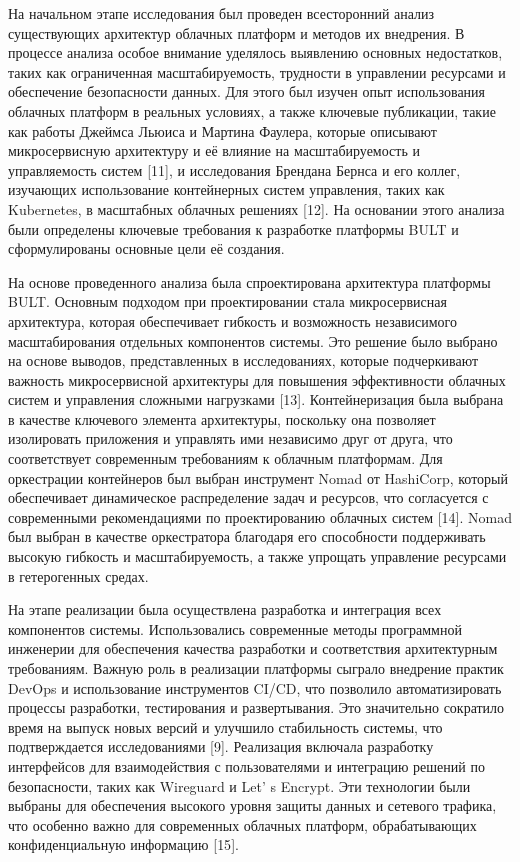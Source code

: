 {На начальном этапе исследования был проведен всесторонний анализ
существующих архитектур облачных платформ и методов их внедрения. В
процессе анализа особое внимание уделялось выявлению основных
недостатков, таких как ограниченная масштабируемость, трудности в
управлении ресурсами и обеспечение безопасности данных. Для этого был
изучен опыт использования облачных платформ в реальных условиях, а также
ключевые публикации, такие как работы Джеймса Льюиса и Мартина Фаулера,
которые описывают микросервисную архитектуру и её влияние на
масштабируемость и управляемость систем {[}11{]}, и исследования
Брендана Бернса и его коллег, изучающих использование контейнерных
систем управления, таких как Kubernetes, в масштабных облачных решениях
{[}12{]}. На основании этого анализа были определены ключевые требования
к разработке платформы BULT и сформулированы основные цели её создания.

На основе проведенного анализа была спроектирована архитектура платформы
BULT. Основным подходом при проектировании стала микросервисная
архитектура, которая обеспечивает гибкость и возможность независимого
масштабирования отдельных компонентов системы. Это решение было выбрано
на основе выводов, представленных в исследованиях, которые подчеркивают
важность микросервисной архитектуры для повышения эффективности облачных
систем и управления сложными нагрузками {[}13{]}. Контейнеризация была
выбрана в качестве ключевого элемента архитектуры, поскольку она
позволяет изолировать приложения и управлять ими независимо друг от
друга, что соответствует современным требованиям к облачным платформам.
Для оркестрации контейнеров был выбран инструмент Nomad от HashiCorp,
который обеспечивает динамическое распределение задач и ресурсов, что
согласуется с современными рекомендациями по проектированию облачных
систем {[}14{]}. Nomad был выбран в качестве оркестратора благодаря его
способности поддерживать высокую гибкость и масштабируемость, а также
упрощать управление ресурсами в гетерогенных средах.

На этапе реализации была осуществлена разработка и интеграция всех
компонентов системы. Использовались современные методы программной
инженерии для обеспечения качества разработки и соответствия
архитектурным требованиям. Важную роль в реализации платформы сыграло
внедрение практик DevOps и использование инструментов CI/CD, что
позволило автоматизировать процессы разработки, тестирования и
развертывания. Это значительно сократило время на выпуск новых версий и
улучшило стабильность системы, что подтверждается исследованиями
{[}9{]}. Реализация включала разработку интерфейсов для взаимодействия с
пользователями и интеграцию решений по безопасности, таких как Wireguard
и Let' s Encrypt. Эти технологии были выбраны для
обеспечения высокого уровня защиты данных и сетевого трафика, что
особенно важно для современных облачных платформ, обрабатывающих
конфиденциальную информацию {[}15{]}.

}
